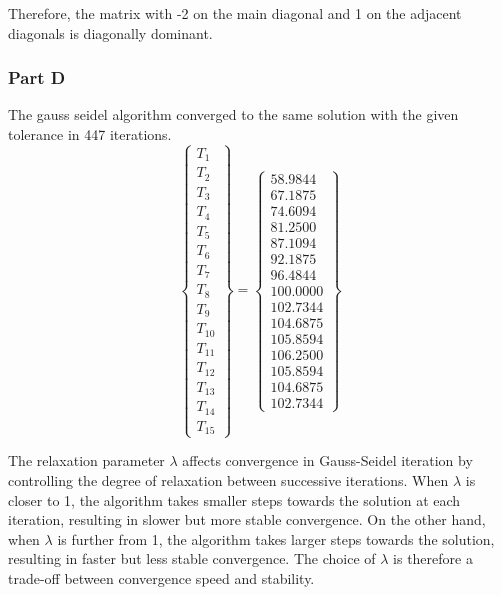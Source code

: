 \documentclass[12pt, a4paper]{article}
\begin{document}
Therefore, the matrix with -2 on the main diagonal and 1 on the adjacent diagonals is diagonally dominant.

\subsubsection{Part D}
The gauss seidel algorithm converged to the same solution with the given tolerance in 447 iterations.
\begin{equation}
\left\{
\begin{array}{c}
T_{1} \\
T_{2} \\
T_{3} \\
T_{4} \\
T_{5} \\
T_{6} \\
T_{7} \\
T_{8} \\
T_{9} \\
T_{10} \\
T_{11} \\
T_{12} \\
T_{13} \\
T_{14} \\
T_{15}
\end{array}
\right\}=
\left\{
\begin{array}{c}
58.9844 \\
67.1875 \\
74.6094 \\
81.2500 \\
87.1094 \\
92.1875 \\
96.4844 \\
100.0000 \\
102.7344 \\
104.6875 \\
105.8594 \\
106.2500 \\
105.8594 \\
104.6875 \\
102.7344
\end{array}
\right\}
\end{equation}

The relaxation parameter $\lambda$ affects convergence in Gauss-Seidel iteration by controlling the degree of relaxation between successive iterations. When $\lambda$ is closer to 1, the algorithm takes smaller steps towards the solution at each iteration, resulting in slower but more stable convergence. On the other hand, when $\lambda$ is further from 1, the algorithm takes larger steps towards the solution, resulting in faster but less stable convergence. The choice of $\lambda$ is therefore a trade-off between convergence speed and stability.
\end{document}
